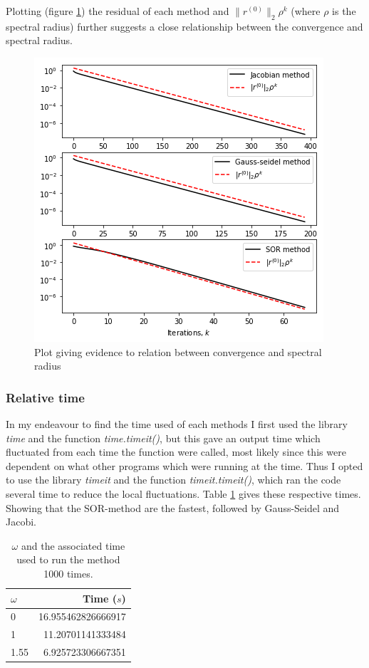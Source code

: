 \documentclass[12pt, a4paper,usenames,dvipsnames]{article}
\begin{document}
\noindent Plotting (figure \ref{fig:specres}) the residual of each method and \(\|r^{(0)}\|_2\rho^k\) (where \(\rho\) is the spectral radius) further suggests a close relationship between the convergence and spectral radius.
\begin{figure}[h!]
    \centering
    \includegraphics[width=\linewidth]{2b.png}
    \caption{Plot giving evidence to relation between convergence and spectral radius}
    \label{fig:specres}
\end{figure}
\subsubsection*{Relative time}
In my endeavour to find the time used of each methods I first used the library \textit{time} and the function \textit{time.timeit()}, but this gave an output time which fluctuated from each time the function were called, most likely since this were dependent on what other programs which were running at the time. Thus I opted to use the library \textit{timeit} and the function \textit{timeit.timeit()}, which ran the code several time to reduce the local fluctuations. Table \ref{tab:time} gives these respective times. Showing that the SOR-method are the fastest, followed by Gauss-Seidel and Jacobi.
\begin{table}[h!]
    \centering
    \begin{tabular}{lr}
        \(\omega\) & Time (\(s\))  \\ \hline
        0 &16.955462826666917\\
        1&11.20701141333484\\
        1.55&6.925723306667351
        
    \end{tabular}
    \caption{\(\omega\) and the associated time used to run the method 1000 times.}
    \label{tab:time}
\end{table}
\end{document}

